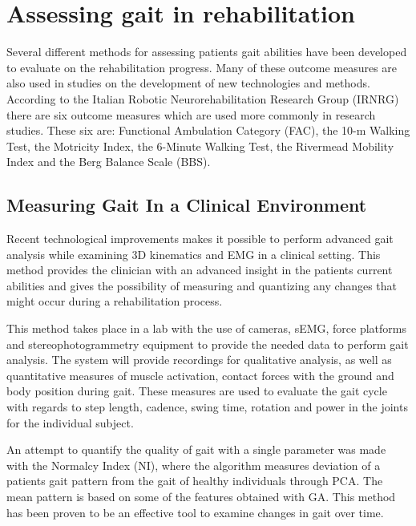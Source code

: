 \section{Assessing gait in rehabilitation}

Several different methods for assessing patients gait abilities have been developed to evaluate on the rehabilitation progress. Many of these outcome measures are also used in studies on the development of new technologies and methods. According to the Italian Robotic Neurorehabilitation Research Group (IRNRG) there are six outcome measures which are used more commonly in research studies. These six are: Functional Ambulation Category (FAC), the 10-m Walking Test, the Motricity Index, the 6-Minute Walking Test, the Rivermead Mobility Index and the Berg Balance Scale (BBS). \cite{Sandrini2018}

\subsection{Measuring Gait In a Clinical Environment}

Recent technological improvements makes it possible to perform advanced gait analysis while examining 3D kinematics and EMG in a clinical setting. This method provides the clinician with an advanced insight in the patients current abilities and gives the possibility of measuring and quantizing any changes that might occur during a rehabilitation process. \cite{Sandrini2018}

This method takes place in a lab with the use of cameras, sEMG, force platforms and stereophotogrammetry equipment to provide the needed data to perform gait analysis. The system will provide recordings for qualitative analysis, as well as quantitative measures of muscle activation, contact forces with the ground and body position during gait. These measures are used to evaluate the gait cycle with regards to step length, cadence, swing time, rotation and power in the joints for the individual subject. \cite{Sandrini2018}

An attempt to quantify the quality of gait with a single parameter was made with the Normalcy Index (NI), where the algorithm measures deviation of a patients gait pattern from the gait of healthy individuals through PCA. The mean pattern is based on some of the features obtained with GA. This method has been proven to be an effective tool to examine changes in gait over time. \cite{Sandrini2018}

